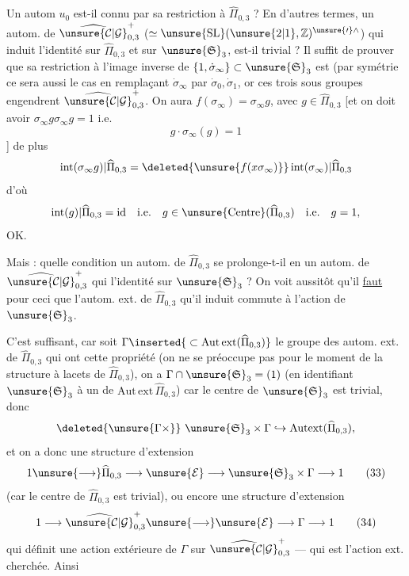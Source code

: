 Un  autom $u_0$ est-il connu par sa restriction à $\widehat\Pi_{0,3}$ ? En d'autres termes, un autom. de $\widehat{\unsure{\mathcal C|\mathcal G}}_{0,3}^{+}$  ($\simeq\unsure{\mathrm{SL}}(\unsure{2|1},\mathbb Z)^{\unsure{\prime}\wedge}$) qui induit l'identité sur $\widehat\Pi_{0,3}$ et sur $\unsure{\mathfrak S}_{3}$, est-il trivial ? Il suffit de prouver que sa restriction à l'image inverse  de $\{1,\dot\sigma_\infty\}\subset\unsure{\mathfrak S}_{3}$ est  (par symétrie ce sera aussi le cas en remplaçant $\dot\sigma_\infty$ par $\dot\sigma_0,\dot\sigma_1$, or ces trois sous groupes engendrent $\widehat{\unsure{\mathcal C|\mathcal G}}_{0,3}^{+}$. On aura $f(\sigma_\infty)=\sigma_\infty g$, avec $g\in\widehat\Pi_{0,3}$ [et on doit avoir $\sigma_\infty g\sigma_\infty g=1$ i.e.
\[
g\cdot\sigma_\infty(g)=1
\]
]
de plus  
\[
\operatorname{int}(\sigma_\infty g)\vert\widehat\Pi_{0,3}
=\deleted{\unsure{f(x\sigma_\infty)}}\operatorname{int}(\sigma_\infty)\vert\widehat\Pi_{0,3}
\]
d'où 
\[
\operatorname{int}(g)\vert\widehat\Pi_{0,3}=\mathrm{id}
\quad\text{i.e.}\quad
g\in\unsure{\operatorname{Centre}}(\widehat\Pi_{0,3})
\quad\text{i.e.}\quad g=1,
\]
OK.

Mais : quelle condition un autom. de $\widehat\Pi_{0,3}$  se prolonge-t-il en un autom. de $\widehat{\unsure{\mathcal C|\mathcal G}}_{0,3}^{+}$ qui  l'identité sur $\unsure{\mathfrak S}_{3}$ ? On voit aussitôt qu'il \uline{faut} pour ceci que l'autom. ext. de $\widehat\Pi_{0,3}$ qu'il induit commute à l'action de $\unsure{\mathfrak S}_{3}$.


C'est suffisant, car soit $\Gamma\inserted{{}\subset\mathrm{Aut\,ext}(\widehat{\Pi}_{0,3})}$ le groupe des autom.
ext. de $\widehat{\Pi}_{0,3}$ qui ont cette propriété (on ne
se préoccupe pas pour le moment de la
structure à lacets de $\widehat{\Pi}_{0,3}$), on a
$\Gamma\cap\unsure{\mathfrak S}_3=(1)$ (en identifiant $\unsure{\mathfrak S}_3$ à un
 de $\mathrm{Aut\,ext}\,\widehat{\Pi}_{0,3}$) car  le centre
de $\unsure{\mathfrak S}_3$ est trivial, donc
\[
\deleted{\unsure{\Gamma\times}}\ \unsure{\mathfrak S}_3\times\Gamma\hookrightarrow\mathrm{Autext}(\widehat{\Pi}_{0,3}),
\]
et on a donc une structure d'extension
\[
1\unsure{\longrightarrow}\widehat{\Pi}_{0,3}\longrightarrow\unsure{\mathcal E}\longrightarrow\unsure{\mathfrak S}_3\times\Gamma\longrightarrow1
\tag{33}
\]
(car le centre de $\widehat{\Pi}_{0,3}$ est trivial), ou encore
une structure d'extension
\[
1\longrightarrow\widehat{\unsure{\mathcal C|\mathcal G}}_{0,3}^{+}\unsure{\longrightarrow}\unsure{\mathcal E}\longrightarrow\Gamma\longrightarrow1
\tag{34}
\]
qui définit une action extérieure de $\Gamma$
sur $\widehat{\unsure{\mathcal C|\mathcal G}}_{0,3}^{+}$ --- qui est l'action ext.
cherchée. Ainsi

